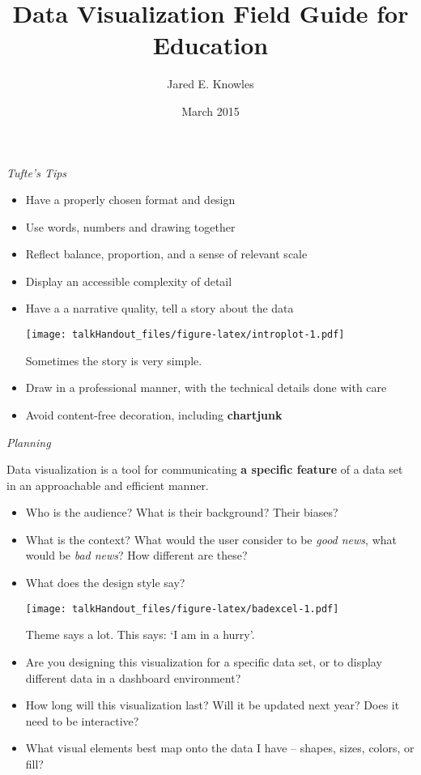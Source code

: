 \documentclass{tufte-handout}
\title{Data Visualization Field Guide for Education}
\author{Jared E. Knowles}
\date{March 2015}
\begin{document}
\maketitle


\vspace{5mm}
\noindent \emph{Tufte's Tips}

\begin{itemize}
\itemsep1pt\parskip0pt
\item
  Have a properly chosen format and design
\item
  Use words, numbers and drawing together
\item
  Reflect balance, proportion, and a sense of relevant scale
\item
  Display an accessible complexity of detail
\item
  Have a a narrative quality, tell a story about the data

  \begin{marginfigure}
   \texttt{[image: talkHandout\_files/figure-latex/introplot-1.pdf]}
  \caption{Sometimes the story is very simple.}
  \end{marginfigure}
\item
  Draw in a professional manner, with the technical details done with
  care
\item
  Avoid content-free decoration, including \textbf{chartjunk}
\end{itemize}

\vspace{2.5mm}
\noindent \emph{Planning}

\noindent Data visualization is a tool for communicating \textbf{a
specific feature} of a data set in an approachable and efficient
manner.

\begin{itemize}
\itemsep1pt\parskip0pt
\item
  Who is the audience? What is their background? Their biases?
\item
  What is the context? What would the user consider to be \emph{good
  news}, what would be \emph{bad news}? How different are these?
\item
  What does the design style say?

  \begin{marginfigure}
   \texttt{[image: talkHandout\_files/figure-latex/badexcel-1.pdf]}
  \caption{Theme says a lot. This says: `I am in a hurry'.}
  \end{marginfigure}
\item
  Are you designing this visualization for a specific data set, or to
  display different data in a dashboard environment?
\item
  How long will this visualization last? Will it be updated next year?
  Does it need to be interactive?
\item
  What visual elements best map onto the data I have -- shapes, sizes,
  colors, or fill?
\end{itemize}
\end{document}
